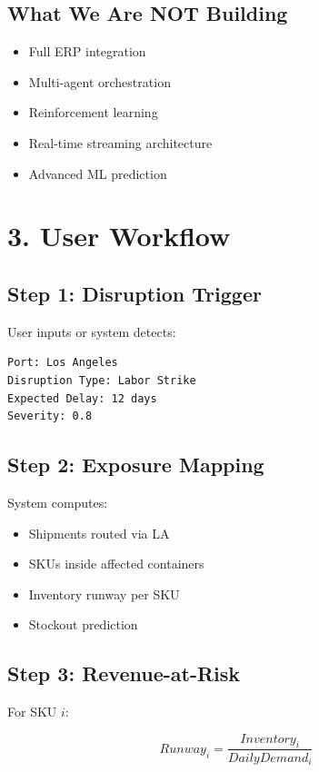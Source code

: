 \documentclass[11pt]{article}
\begin{document}
\subsection*{What We Are NOT Building}

\begin{itemize}
    \item Full ERP integration
    \item Multi-agent orchestration
    \item Reinforcement learning
    \item Real-time streaming architecture
    \item Advanced ML prediction
\end{itemize}

\section*{3. User Workflow}

\subsection*{Step 1: Disruption Trigger}

User inputs or system detects:

\begin{verbatim}
Port: Los Angeles
Disruption Type: Labor Strike
Expected Delay: 12 days
Severity: 0.8
\end{verbatim}

\subsection*{Step 2: Exposure Mapping}

System computes:

\begin{itemize}
    \item Shipments routed via LA
    \item SKUs inside affected containers
    \item Inventory runway per SKU
    \item Stockout prediction
\end{itemize}

\subsection*{Step 3: Revenue-at-Risk}

For SKU $i$:

\[
Runway_i = \frac{Inventory_i}{DailyDemand_i}
\]
\end{document}
